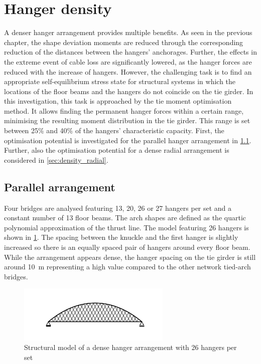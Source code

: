 \newpage
\section{Hanger density} \label{sec:hanger_density}
A denser hanger arrangement provides multiple benefits. As seen in the previous chapter, the shape deviation moments are reduced through the corresponding reduction of the distances between the hangers' anchorages. Further, the effects in the extreme event of cable loss are significantly lowered, as the hanger forces are reduced with the increase of hangers. 
However, the challenging task is to find an appropriate self-equilibrium stress state for structural systems in which the locations of the floor beams and the hangers do not coincide on the tie girder. 
In this investigation, this task is approached by the tie moment optimisation method. It allows finding the permanent hanger forces within a certain range, minimising the resulting moment distribution in the tie girder. This range is set between 25\% and 40\% of the hangers' characteristic capacity. First, the optimisation potential is investigated for the parallel hanger arrangement in \cref{sec:density_parallel}. Further, also the optimisation potential for a dense radial arrangement is considered in \cref{sec:density_radial}.

\subsection{Parallel arrangement} \label{sec:density_parallel}
Four bridges are analysed featuring 13, 20, 26 or 27 hangers per set and a constant number of 13 floor beams. The arch shapes are defined as the quartic polynomial approximation of the thrust line. The model featuring 26 hangers is shown in \cref{fig:structure_26}. The spacing between the knuckle and the first hanger is slightly increased so there is an equally spaced pair of hangers around every floor beam. While the arrangement appears dense, the hanger spacing on the tie girder is still around \SI{10}{m} representing a high value compared to the other network tied-arch bridges.

\begin{figure}[H]
    \centering
    \includegraphics[trim={0 1cm 0 1cm},clip, width=0.65\textwidth]{calculations/hanger amount comparison/structure_26.png}
    \caption{Structural model of a dense hanger arrangement with 26 hangers per set}
    \label{fig:structure_26}
\end{figure}

